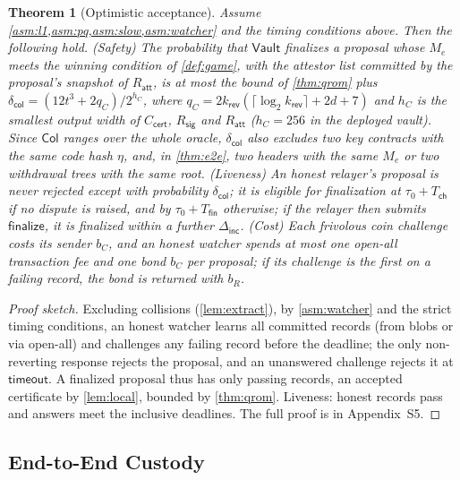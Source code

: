 \documentclass[10pt,journal,compsoc]{IEEEtran}
\theoremstyle{tplain}
\newtheorem{theorem}{Theorem}
\theoremstyle{tdef}
\theoremstyle{remark}
\newcommand{\supp}[1]{Appendix~#1}
\newcommand{\Rsig}{R_{\mathsf{sig}}}
\newcommand{\Ratt}{R_{\mathsf{att}}}
\newcommand{\kr}{k_{\mathsf{rev}}}
\newcommand{\cert}{\mathsf{cert}}
\newcommand{\Vault}{\mathsf{Vault}}
\begin{document}
\begin{theorem}[Optimistic acceptance]\label{thm:opf}
Assume \cref{asm:l1,asm:pq,asm:slow,asm:watcher} and the timing conditions above. Then the following hold. (Safety) The probability that $\Vault$ finalizes a proposal whose $M_e$ meets the winning condition of \cref{def:game}, with the attestor list committed by the proposal's snapshot of $\Ratt$, is at most the bound of \cref{thm:qrom} plus $\delta_{\mathsf{col}}=(12t^3+2q_C)/2^{h_C}$, where $q_C=2\kr(\lceil\log_2\kr\rceil+2d+7)$ and $h_C$ is the smallest output width of $C_{\cert}$, $\Rsig$ and $\Ratt$ ($h_C=256$ in the deployed vault). Since $\mathsf{Col}$ ranges over the whole oracle, $\delta_{\mathsf{col}}$ also excludes two key contracts with the same code hash $\eta$, and, in \cref{thm:e2e}, two headers with the same $M_e$ or two withdrawal trees with the same root. (Liveness) An honest relayer's proposal is never rejected except with probability $\delta_{\mathsf{col}}$; it is eligible for finalization at $\tau_0+T_{\mathsf{ch}}$ if no dispute is raised, and by $\tau_0+T_{\mathsf{fin}}$ otherwise; if the relayer then submits $\mathsf{finalize}$, it is finalized within a further $\Delta_{\mathsf{inc}}$. (Cost) Each frivolous coin challenge costs its sender $b_C$, and an honest watcher spends at most one open-all transaction fee and one bond $b_C$ per proposal; if its challenge is the first on a failing record, the bond is returned with $b_R$.
\end{theorem}
\begin{proof}[Proof sketch]
Excluding collisions (\cref{lem:extract}), by \cref{asm:watcher} and the strict timing conditions, an honest watcher learns all committed records (from blobs or via open-all) and challenges any failing record before the deadline; the only non-reverting response rejects the proposal, and an unanswered challenge rejects it at $\mathsf{timeout}$. A finalized proposal thus has only passing records, an accepted certificate by \cref{lem:local}, bounded by \cref{thm:qrom}. Liveness: honest records pass and answers meet the inclusive deadlines. The full proof is in \supp{S5}.
\end{proof}

\subsection{End-to-End Custody}
\end{document}
